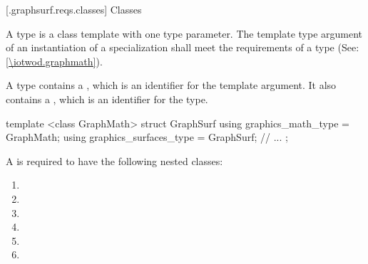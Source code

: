 
 [\iotwod.graphsurf.reqs.classes] {Classes}

\pnum
A \graphicssurfacestemplparam type is a class template with one type parameter. The template type argument of an instantiation of a \graphicssurfacestemplparam specialization shall meet the requirements of a \graphicsmathtemplparam type (See: \ref{\iotwod.graphmath}).

\pnum
A \graphicssurfacestemplparam type contains a  , which is an identifier for the template argument. It also contains a  , which is an identifier for the \graphicssurfacestemplparam type.

\pnum
\begin{example}
\begin{codeblock}
template <class GraphMath>
struct GraphSurf {
  using graphics_math_type = GraphMath;
  using graphics_surfaces_type = GraphSurf;
  // ...
};
\end{codeblock}
\end{example}

\pnum
A \graphicssurfacestemplparam is required to have the following  nested classes:

\begin{enumerate}
\item {}
\item {}
\item {}
\item {}
\item {}
\item {}
\end{enumerate}
